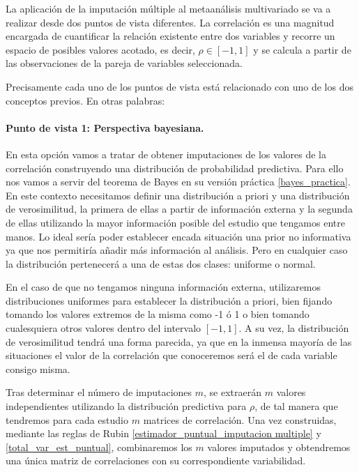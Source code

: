 \documentclass[a4paper,openright,12pt]{report}
\begin{document}
La aplicación de la imputación múltiple al metaanálisis multivariado se va a realizar desde dos puntos de vista diferentes. La correlación es una magnitud encargada de cuantificar la relación existente entre dos variables y recorre un espacio de posibles valores acotado, es decir, $\rho \in \left[ -1,1 \right]$ y se calcula a partir de las observaciones de la pareja de variables seleccionada.

Precisamente cada uno de los puntos de vista está relacionado con uno de los dos conceptos previos. En otras palabras:

\paragraph{Punto de vista 1: Perspectiva bayesiana.} 
En esta opción vamos a tratar de obtener imputaciones de los valores de la correlación construyendo una distribución de probabilidad predictiva. Para ello nos vamos a servir del teorema de Bayes en su versión práctica \ref{bayes_practica}. En este contexto necesitamos definir una distribución a priori y una distribución de verosimilitud, la primera de ellas a partir de información externa y la segunda de ellas utilizando la mayor información posible del estudio que tengamos entre manos. Lo ideal sería poder establecer encada situación una prior no informativa ya que nos permitiría añadir más información al análisis. Pero en cualquier caso la distribución pertenecerá a una de estas dos clases: uniforme o normal.

En el caso de que no tengamos ninguna información externa, utilizaremos distribuciones uniformes para establecer la distribución a priori, bien fijando tomando los valores extremos de la misma como -1 ó 1 o bien tomando cualesquiera otros valores dentro del intervalo $\left[ -1,1 \right]$. A su vez, la distribución de verosimilitud tendrá una forma parecida, ya que en la inmensa mayoría de las situaciones el valor de la correlación que conoceremos será el de cada variable consigo misma.

Tras determinar el número de imputaciones $m$, se extraerán $m$ valores independientes utilizando la distribución predictiva para $\rho$, de tal manera que tendremos para cada estudio $m$ matrices de correlación. Una vez construidas, mediante las reglas de Rubin \ref{estimador_puntual_imputacion multiple} y \ref{total_var_est_puntual}, combinaremos los $m$ valores imputados y obtendremos una única matriz de correlaciones con su correspondiente variabilidad. 
\end{document}
